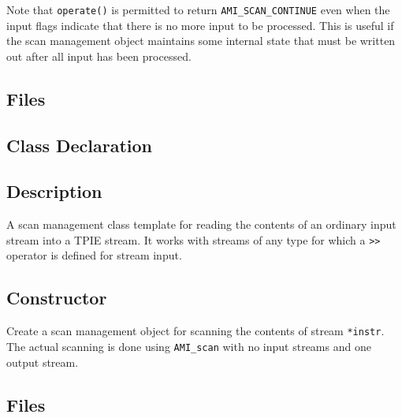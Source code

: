     Note that \lstinline|operate()| is permitted to return
    \lstinline|AMI_SCAN_CONTINUE| even when the input flags indicate
    that there is no more input to be processed.  This is useful if
    the scan management object maintains some internal state that must
    be written out after all input has been processed.






\subsection{Files}
  \btabb
     {}
  \etabb


\subsection{Class Declaration}
  \btabb
     {}
  \etabb

\subsection{Description}
A scan management class template for reading the contents of an
ordinary \CPP{} input stream into a TPIE stream.  It works with
streams of any type for which a \lstinline|>>| operator is defined for
\CPP{} stream input.

\subsection{Constructor}
\btabb {}
{Create a scan management object for scanning the contents of \CPP{}
  stream \lstinline|*instr|. The actual scanning is done using
  \lstinline|AMI_scan| with no input streams and one output stream.}
\etabb



\subsection{Files}
  \btabb
     {}
  \etabb


